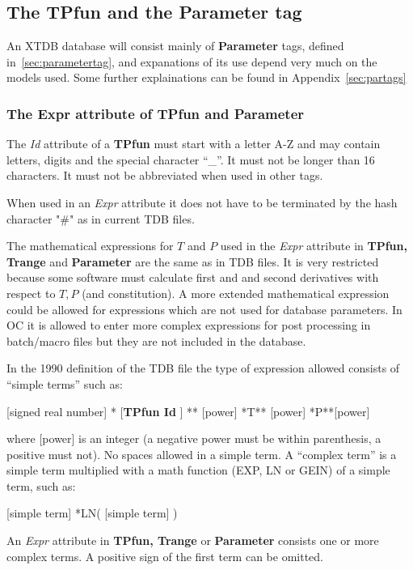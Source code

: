 \documentclass{article}
\begin{document}
\subsection{The TPfun and the Parameter tag}

An XTDB database will consist mainly of {\bf Parameter} tags, defined
in~\ref{sec:parametertag}, and expanations of its use depend very much
on the models used.  Some further explainations can be found in
Appendix~\ref{sec:partags}

\subsubsection{The Expr attribute of TPfun and Parameter}\label{sec:tpfunattr}\label{sec:expr}

The {\em Id} attribute of a {\bf TPfun} must start with a letter A-Z
and may contain letters, digits and the special character ``\_''.  It
must not be longer than 16 characters.  It must not be abbreviated
when used in other tags.

When used in an {\em Expr} attribute it does not have to be terminated
by the hash character "\#" as in current TDB files.

The mathematical expressions for $T$ and $P$ used in the {\em Expr}
attribute in {\bf TPfun, Trange} and {\bf Parameter} are the same as
in TDB files.  It is very restricted because some software must
calculate first and and second derivatives with respect to $T, P$ (and
constitution).  A more extended mathematical expression could be
allowed for expressions which are not used for database parameters.
In OC it is allowed to enter more complex expressions for post
processing in batch/macro files but they are not included in the
database.

In the 1990 definition of the TDB file the type of expression allowed
consists of ``simple terms'' such as:

[signed real number] * [{\bf TPfun Id} ] ** [power] *T** [power] *P**[power]

where [power] is an integer (a negative power must be within
parenthesis, a positive must not).  No spaces allowed in a simple
term.  A ``complex term'' is a simple term multiplied with a math
function (EXP, LN or GEIN) of a simple term, such as:

[simple term] *LN( [simple term] )

An {\em Expr} attribute in {\bf TPfun, Trange} or {\bf Parameter}
consists one or more complex terms.  A positive sign of the first term
can be omitted.
  
\end{document}
